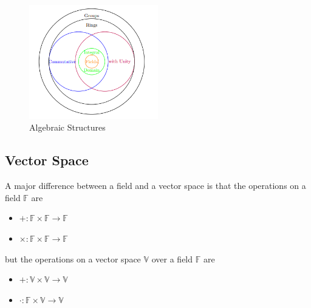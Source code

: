 \documentclass[11pt]{book} %
\begin{document}
\begin{figure}
    \centering
    \includegraphics[width=0.5\textwidth]{Figs/algebric_structures.png}
    \caption{Algebraic Structures}
\end{figure}

\subsection{Vector Space}

A major difference between a field and a vector space is that the operations on a field \( \mathbb{F} \) are
\begin{itemize}
    \item \( +: \mathbb{F} \times \mathbb{F} \to \mathbb{F} \)
    \item \( \times: \mathbb{F} \times \mathbb{F} \to \mathbb{F} \)
\end{itemize}

but the operations on a vector space \( \mathbb{V} \) over a field \( \mathbb{F} \) are
\begin{itemize}
    \item \( +: \mathbb{V} \times \mathbb{V} \to \mathbb{V} \)
    \item \( \cdot: \mathbb{F} \times \mathbb{V} \to \mathbb{V} \)
\end{itemize}

\bigbreak
\end{document}
